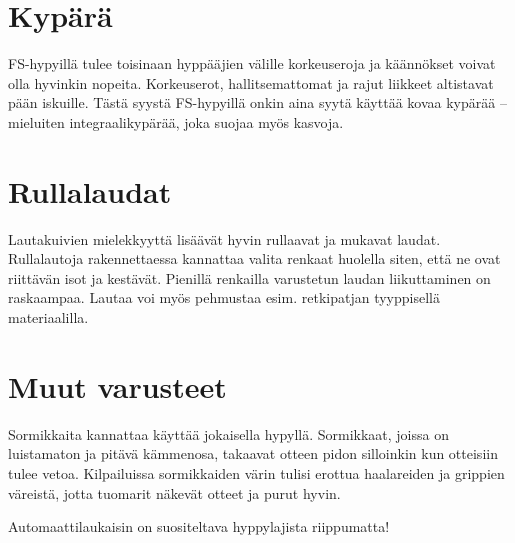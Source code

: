 \section{ Kypärä }
\label{fs-hyppaajan-varusteet-kypara}


FS-hypyillä tulee toisinaan hyppääjien välille korkeuseroja ja käännökset voivat olla hyvinkin nopeita. Korkeuserot, hallitsemattomat ja rajut liikkeet altistavat pään iskuille. Tästä syystä FS-hypyillä onkin aina syytä käyttää kovaa kypärää -- mieluiten integraalikypärää, joka suojaa myös kasvoja. 

\section{ Rullalaudat }
\label{fs-hyppaajan-varusteet-rullalaudat}


Lautakuivien mielekkyyttä lisäävät hyvin rullaavat ja mukavat laudat. Rullalautoja rakennettaessa kannattaa valita renkaat huolella siten, että ne ovat riittävän isot ja kestävät. Pienillä renkailla varustetun laudan liikuttaminen on raskaampaa. Lautaa voi myös pehmustaa esim. retkipatjan tyyppisellä materiaalilla. 

\section{ Muut varusteet }
\label{fs-hyppaajan-varusteet-muut-varusteet}


Sormikkaita kannattaa käyttää jokaisella hypyllä. Sormikkaat, joissa on luistamaton ja pitävä kämmenosa, takaavat otteen pidon silloinkin kun otteisiin tulee vetoa. Kilpailuissa sormikkaiden värin tulisi erottua haalareiden ja grippien väreistä, jotta tuomarit näkevät otteet ja purut hyvin. 


Automaattilaukaisin on suositeltava hyppylajista riippumatta! 

